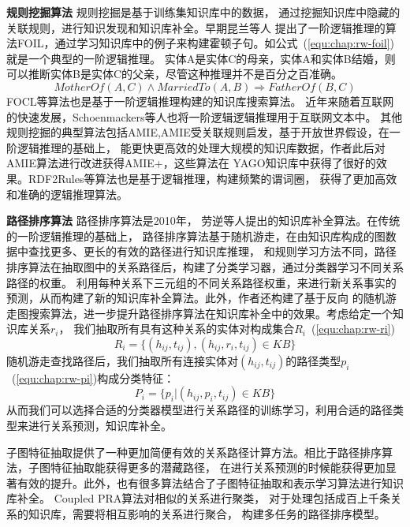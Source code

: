 \textbf{规则挖掘算法} 规则挖掘是基于训练集知识库中的数据，
通过挖掘知识库中隐藏的关联规则，进行知识发现和知识库补全。早期昆兰等人
提出了一阶逻辑推理的算法FOIL\cite{Quinlan1993FOILAM}，通过学习知识库中的例子来构建霍顿子句。如公式~(\ref{equ:chap:rw-foil})就是一个典型的一阶逻辑推理。
实体A是实体C的母亲，实体A和实体B结婚，则可以推断实体B是实体C的父亲，尽管这种推理并不是百分之百准确。
\begin{equation}
\label{equ:chap:rw-foil}
MotherOf(A,C)\land MarriedTo(A,B)\Rightarrow FatherOf(B,C)
\end{equation}
FOCL\cite{PAZZANI1991DetectingAC}等算法也是基于一阶逻辑推理构建的知识库搜索算法。
近年来随着互联网的快速发展，Schoenmackers\cite{Schoenmackers:2010}等人也将一阶逻辑逻辑推理用于互联网文本中。
其他规则挖掘的典型算法包括AMIE\cite{Galarraga2013},AMIE受关联规则启发，基于开放世界假设，在一阶逻辑推理的基础上，
能更快更高效的处理大规模的知识库数据，作者此后对AMIE算法进行改进获得AMIE+\cite{Galrraga2015FastRM}，这些算法在
YAGO知识库中获得了很好的效果。RDF2Rules\cite{Wang2015RDF2RulesLR}等算法也是基于逻辑推理，构建频繁的谓词圈，
获得了更加高效和准确的逻辑推理算法。

\textbf{路径排序算法} 路径排序算法\cite{Lao2010}是2010年，
劳逆等人提出的知识库补全算法。在传统的一阶逻辑推理的基础上，
路径排序算法基于随机游走，在由知识库构成的图数据中查找更多、更长的有效的路径进行知识库推理，
和规则学习方法不同，路径排序算法在抽取图中的关系路径后，构建了分类学习器，通过分类器学习不同关系路径的权重。
利用每种关系下三元组的不同关系路径权重，来进行新关系事实的预测，从而构建了新的知识库补全算法。此外，作者还构建了基于反向
的随机游走图搜索算法\cite{Lao2015LearningRF}，进一步提升路径排序算法在知识库补全中的效果。考虑给定一个知识库关系$r_i$，
我们抽取所有具有这种关系的实体对构成集合$R_i$~(\ref{equ:chap:rw-ri})
\begin{equation}
\label{equ:chap:rw-ri}
R_i=\{{(h_{ij},t_{ij}),(h_{ij},r_i,t_{ij})\in KB}\}
\end{equation}
随机游走查找路径后，我们抽取所有连接实体对$(h_{ij},t_{ij})$的路径类型$p_i$~(\ref{equ:chap:rw-pi})构成分类特征：
\begin{equation}
\label{equ:chap:rw-pi}
P_i=\{{p_i|(h_{ij},p_i,t_{ij})\in KB}\}
\end{equation}
从而我们可以选择合适的分类器模型进行关系路径的训练学习，利用合适的路径类型来进行关系预测，知识库补全。

子图特征抽取\cite{Gardner2015}提供了一种更加简便有效的关系路径计算方法。相比于路径排序算法，子图特征抽取能获得更多的潜藏路径，
在进行关系预测的时候能获得更加显著有效的提升。此外，也有很多算法结合了子图特征抽取和表示学习算法\cite{Gardner2014}进行知识库补全。
Coupled PRA\cite{Wang2016}算法对相似的关系进行聚类，
对于处理包括成百上千条关系的知识库，需要将相互影响的关系进行聚合，
构建多任务的路径排序模型。


